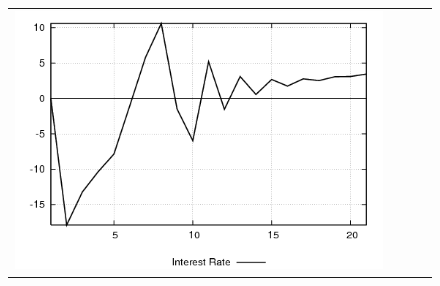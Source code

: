 \begin{figure}
\begin{tabular}{cccc}
\includegraphics[scale=0.22]{results_wlsinit/Interest_Rate_prefshock_irf.png} \\ 
\end{tabular}
\end{figure}
